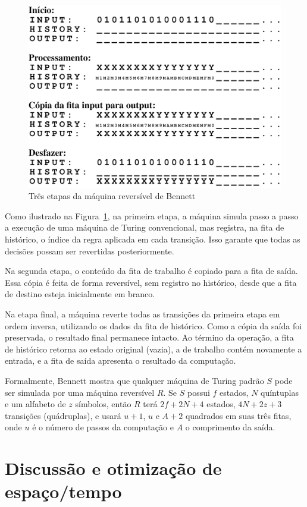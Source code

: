 \documentclass[conference]{IEEEtran}
\begin{document}
\begin{figure}[ht]
\centering
\includegraphics[width=0.9\linewidth]{bennett_machine.png}
\caption{Três etapas da máquina reversível de Bennett}
\label{fig:reversibility}
\end{figure}

Como ilustrado na Figura~\ref{fig:reversibility}, na primeira etapa, a máquina simula passo a passo a execução de uma máquina de Turing convencional, mas registra, na fita de histórico, o índice da regra aplicada em cada transição. Isso garante que todas as decisões possam ser revertidas posteriormente.

Na segunda etapa, o conteúdo da fita de trabalho é copiado para a fita de saída. Essa cópia é feita de forma reversível, sem registro no histórico, desde que a fita de destino esteja inicialmente em branco.

Na etapa final, a máquina reverte todas as transições da primeira etapa em ordem inversa, utilizando os dados da fita de histórico. Como a cópia da saída foi preservada, o resultado final permanece intacto. Ao término da operação, a fita de histórico retorna ao estado original (vazia), a de trabalho contém novamente a entrada, e a fita de saída apresenta o resultado da computação.

Formalmente, Bennett mostra que qualquer máquina de Turing padrão $S$ pode ser simulada por uma máquina reversível $R$. Se $S$ possui $f$ estados, $N$ quíntuplas e um alfabeto de $z$ símbolos, então $R$ terá $2f+2N+4$ estados, $4N+2z+3$ transições (quádruplas), e usará $u+1$, $u$ e $A+2$ quadrados em suas três fitas, onde $u$ é o número de passos da computação e $A$ o comprimento da saída.

\section{Discussão e otimização de espaço/tempo}
\end{document}

